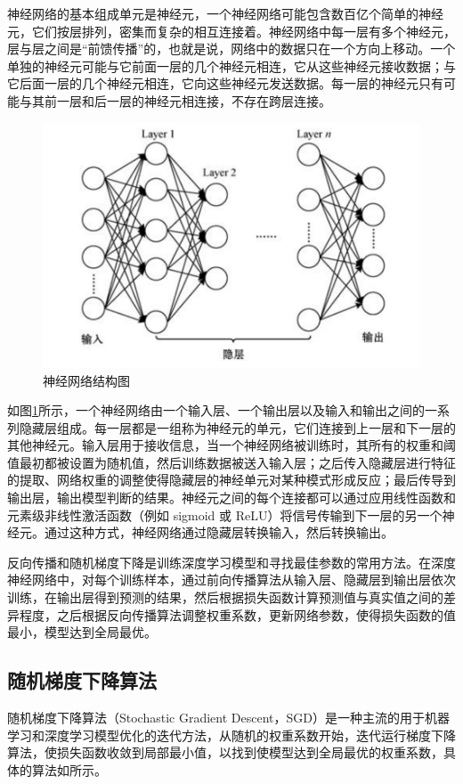 神经网络的基本组成单元是神经元，一个神经网络可能包含数百亿个简单的神经元，它们按层排列，密集而复杂的相互连接着。神经网络中每一层有多个神经元，层与层之间是“前馈传播”的，也就是说，网络中的数据只在一个方向上移动。一个单独的神经元可能与它前面一层的几个神经元相连，它从这些神经元接收数据；与它后面一层的几个神经元相连，它向这些神经元发送数据。每一层的神经元只有可能与其前一层和后一层的神经元相连接，不存在跨层连接。

\begin{figure}[!hbt]
\centering
	\includegraphics[scale=0.5]{fig2/C2/深度神经网络结构图}%
	\caption{神经网络结构图}
	\label{fig:神经网络结构图}	
\end{figure}

如图\ref{fig:神经网络结构图}所示，一个神经网络由一个输入层、一个输出层以及输入和输出之间的一系列隐藏层组成。每一层都是一组称为神经元的单元，它们连接到上一层和下一层的其他神经元。输入层用于接收信息，当一个神经网络被训练时，其所有的权重和阈值最初都被设置为随机值，然后训练数据被送入输入层；之后传入隐藏层进行特征的提取、网络权重的调整使得隐藏层的神经单元对某种模式形成反应；最后传导到输出层，输出模型判断的结果。神经元之间的每个连接都可以通过应用线性函数和元素级非线性激活函数（例如 sigmoid 或 ReLU）将信号传输到下一层的另一个神经元。通过这种方式，神经网络通过隐藏层转换输入，然后转换输出。

反向传播和随机梯度下降是训练深度学习模型和寻找最佳参数的常用方法。在深度神经网络中，对每个训练样本，通过前向传播算法从输入层、隐藏层到输出层依次训练，在输出层得到预测的结果，然后根据损失函数计算预测值与真实值之间的差异程度，之后根据反向传播算法调整权重系数，更新网络参数，使得损失函数的值最小，模型达到全局最优。

\subsection{随机梯度下降算法}
随机梯度下降算法（Stochastic Gradient Descent，SGD）是一种主流的用于机器学习和深度学习模型优化的迭代方法，从随机的权重系数开始，迭代运行梯度下降算法，使损失函数收敛到局部最小值，以找到使模型达到全局最优的权重系数，具体的算法如所示。

